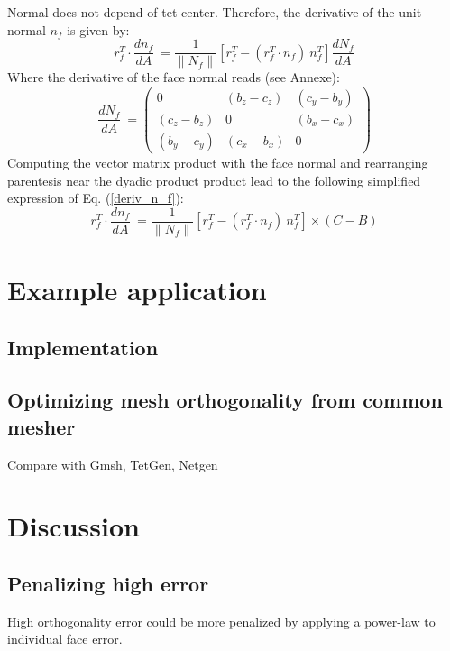\documentclass[11pt]{article}
\begin{document}
Normal does not depend of tet center. Therefore, the derivative of the unit normal $n_f$ is given by:
\begin{equation}
r_f^T\cdot \frac{d n_f}{dA}\ = 
 \frac{1}{\| N_f \|} \left[ r_f^T -  (r_f^T \cdot n_f)\ n_f^T \right] \frac{d N_f}{dA}
 \label{deriv_n_f}
\end{equation}
Where the derivative of the face normal reads (see Annexe):
\begin{equation}
\frac{d N_f}{dA}\ = \begin{pmatrix}
0 & (b_z-c_z) & (c_y-b_y) \\
(c_z-b_z) & 0 & (b_x-c_x) \\
(b_y-c_y) & (c_x-b_x) & 0
\end{pmatrix} 
\end{equation}
Computing the vector matrix product with the face normal and rearranging parentesis near the dyadic product product lead to the following simplified expression of Eq. (\ref{deriv_n_f}):
\begin{equation}
r_f^T\cdot \frac{d n_f}{dA}\ = 
 \frac{1}{\| N_f \|} \left[ r_f^T -  (r_f^T \cdot n_f)\ n_f^T \right] \times (C-B)
\end{equation}







\section{Example application}

\subsection{Implementation}

\subsection{Optimizing mesh orthogonality from common mesher}

Compare with Gmsh, TetGen, Netgen



\section{Discussion}

\subsection{Penalizing high error}
High orthogonality error could be more penalized by applying a power-law to individual face error. 
\end{document}
